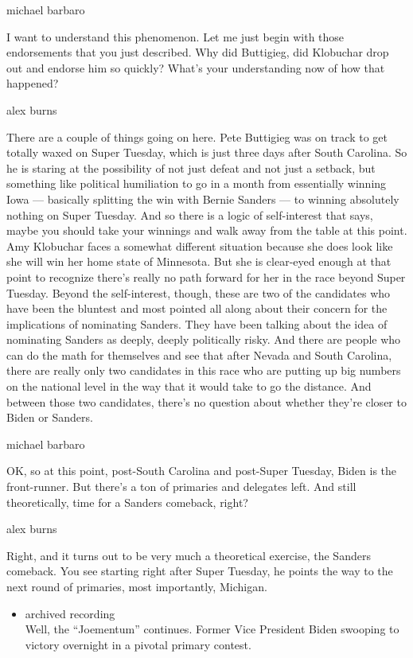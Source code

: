 michael barbaro

I want to understand this phenomenon. Let me just begin with those
endorsements that you just described. Why did Buttigieg, did Klobuchar
drop out and endorse him so quickly? What's your understanding now of
how that happened?

alex burns

There are a couple of things going on here. Pete Buttigieg was on track
to get totally waxed on Super Tuesday, which is just three days after
South Carolina. So he is staring at the possibility of not just defeat
and not just a setback, but something like political humiliation to go
in a month from essentially winning Iowa --- basically splitting the win
with Bernie Sanders --- to winning absolutely nothing on Super Tuesday.
And so there is a logic of self-interest that says, maybe you should
take your winnings and walk away from the table at this point. Amy
Klobuchar faces a somewhat different situation because she does look
like she will win her home state of Minnesota. But she is clear-eyed
enough at that point to recognize there's really no path forward for her
in the race beyond Super Tuesday. Beyond the self-interest, though,
these are two of the candidates who have been the bluntest and most
pointed all along about their concern for the implications of nominating
Sanders. They have been talking about the idea of nominating Sanders as
deeply, deeply politically risky. And there are people who can do the
math for themselves and see that after Nevada and South Carolina, there
are really only two candidates in this race who are putting up big
numbers on the national level in the way that it would take to go the
distance. And between those two candidates, there's no question about
whether they're closer to Biden or Sanders.

michael barbaro

OK, so at this point, post-South Carolina and post-Super Tuesday, Biden
is the front-runner. But there's a ton of primaries and delegates left.
And still theoretically, time for a Sanders comeback, right?

alex burns

Right, and it turns out to be very much a theoretical exercise, the
Sanders comeback. You see starting right after Super Tuesday, he points
the way to the next round of primaries, most importantly, Michigan.

\begin{itemize}
\tightlist
\item
  archived recording\\
  Well, the ``Joementum'' continues. Former Vice President Biden
  swooping to victory overnight in a pivotal primary contest.
\end{itemize}

